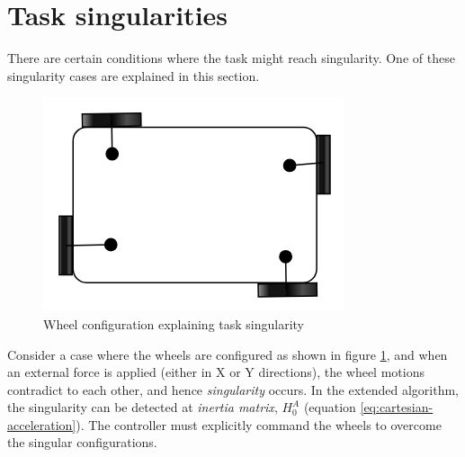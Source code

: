 



\section{Task singularities}
There are certain conditions where the task might reach singularity. One of these singularity cases are explained in this section. 

\begin{figure}[h!]
	\begin{center}
		\includegraphics[scale=0.4]{images/a.png}
	\end{center}
	\caption{Wheel configuration explaining task singularity}
	\label{fig:sing}
\end{figure}

Consider a case where the wheels are configured as shown in figure \ref{fig:sing}, and when an external force is applied (either in X or Y directions), the wheel motions contradict to each other, and hence \textit{singularity} occurs. In the extended algorithm, the singularity can be detected at \textit{inertia matrix}, $H_0^A$ (equation \ref{eq:cartesian-acceleration}). The controller must explicitly command the wheels to overcome the singular configurations. 


